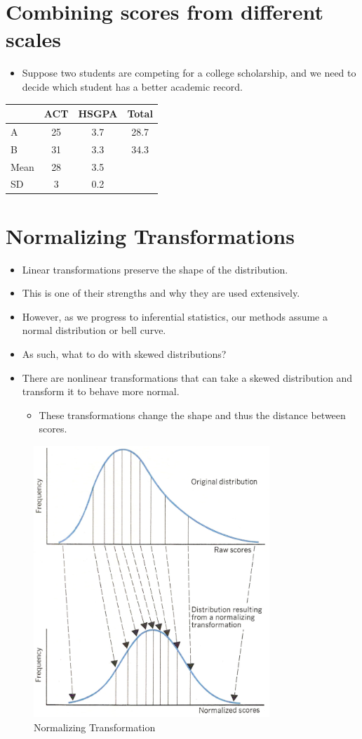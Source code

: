 \documentclass[12pt]{article}
\begin{document}
\section{Combining scores from different
scales}\label{combining-scores-from-different-scales}

\begin{itemize}
\itemsep1pt\parskip0pt
\item
  Suppose two students are competing for a college scholarship, and we
  need to decide which student has a better academic record.
\end{itemize}

\begin{longtable}[c]{@{}lccc@{}}
\toprule
& ACT & HSGPA & Total\tabularnewline
\midrule
\endhead
A & 25 & 3.7 & 28.7\tabularnewline
B & 31 & 3.3 & 34.3\tabularnewline
\midrule
Mean & 28 & 3.5 &\tabularnewline
SD & 3 & 0.2 &\tabularnewline
\bottomrule
\end{longtable}

\section{Normalizing Transformations}\label{normalizing-transformations}

\begin{itemize}
\itemsep1pt\parskip0pt
\item
  Linear transformations preserve the shape of the distribution.
\item
  This is one of their strengths and why they are used extensively.
\item
  However, as we progress to inferential statistics, our methods assume
  a normal distribution or bell curve.
\item
  As such, what to do with skewed distributions?
\item
  There are nonlinear transformations that can take a skewed
  distribution and transform it to behave more normal.

  \begin{itemize}
  \itemsep1pt\parskip0pt
  \item
    These transformations change the shape and thus the distance between
    scores.
  \end{itemize}
\end{itemize}

\begin{figure}[H]
\centering
\includegraphics[width=3.5in]{normalizingtransformation.png}
\caption{Normalizing Transformation}
\end{figure}
\end{document}
